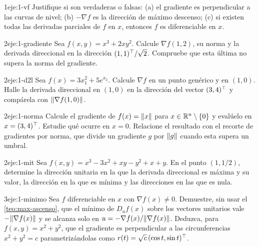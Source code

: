 \begin{ejercicio}{1}{eje:1-vf}
Justifique si son verdaderas o falsas: (a) el gradiente es perpendicular a las curvas de nivel; (b) $-\nabla f$ es la dirección de máximo descenso; (c) si existen todas las derivadas parciales de $f$ en $x$, entonces $f$ es diferenciable en $x$.
\end{ejercicio}

\begin{ejercicio}{2}{eje:1-gradiente}
Sea $f(x,y)=x^{3}+2xy^{2}$. Calcule $\nabla f(1,2)$, su norma y la derivada direccional en la dirección $(1,1)^{\top}/\sqrt{2}$. Compruebe que esta última no supera la norma del gradiente.
\end{ejercicio}

\begin{ejercicio}{2}{eje:1-d2l}
Sea $f(x)=3x_1^{2}+5e^{x_2}$. Calcule $\nabla f$ en un punto genérico y en $(1,0)$. Halle la derivada direccional en $(1,0)$ en la dirección del vector $(3,4)^{\top}$ y compárela con $\lVert\nabla f(1,0)\rVert$.
\end{ejercicio}

\begin{ejercicio}{2}{eje:1-norma}
Calcule el gradiente de $f(x)=\lVert x\rVert$ para $x\in\mathbb{R}^{n}\setminus\{0\}$ y evalúelo en $x=(3,4)^{\top}$. Estudie qué ocurre en $x=0$. Relacione el resultado con el recorte de gradientes por norma, que divide un gradiente $g$ por $\lVert g\rVert$ cuando esta supera un umbral.
\end{ejercicio}

\begin{ejercicio}{2}{eje:1-mit}
Sea $f(x,y)=x^{3}-3x^{2}+xy-y^{2}+x+y$. En el punto $(1,1/2)$, determine la dirección unitaria en la que la derivada direccional es máxima y su valor, la dirección en la que es mínima y las direcciones en las que es nula.
\end{ejercicio}

\begin{ejercicio}{3}{eje:1-minimo}
Sea $f$ diferenciable en $x$ con $\nabla f(x)\ne 0$. Demuestre, sin usar el \cref{teo:max-ascenso}, que el mínimo de $D_u f(x)$ sobre los vectores unitarios vale $-\lVert\nabla f(x)\rVert$ y se alcanza solo en $u=-\nabla f(x)/\lVert\nabla f(x)\rVert$. Deduzca, para $f(x,y)=x^{2}+y^{2}$, que el gradiente es perpendicular a las circunferencias $x^{2}+y^{2}=c$ parametrizándolas como $r(t)=\sqrt{c}\,(\cos t,\sin t)^{\top}$.
\end{ejercicio}

